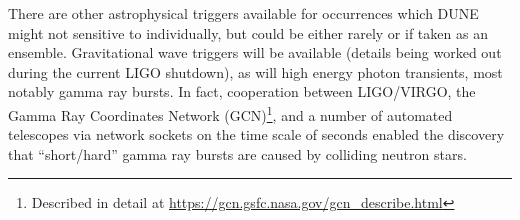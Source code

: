 There are other astrophysical triggers available for occurrences which
DUNE might not sensitive to individually, but could be either rarely
or if taken as an ensemble.
Gravitational wave triggers will be available (details being worked
out during the current LIGO shutdown), as will high energy photon
transients, most notably gamma ray bursts.
In fact, cooperation between LIGO/VIRGO, the Gamma Ray Coordinates
Network (GCN)\footnote{Described in detail at
  \url{https://gcn.gsfc.nasa.gov/gcn_describe.html}}, and a number of
automated telescopes via network sockets on the time scale of seconds
enabled the discovery that ``short/hard'' gamma ray bursts are caused
by colliding neutron stars\cite{kilonova}.
